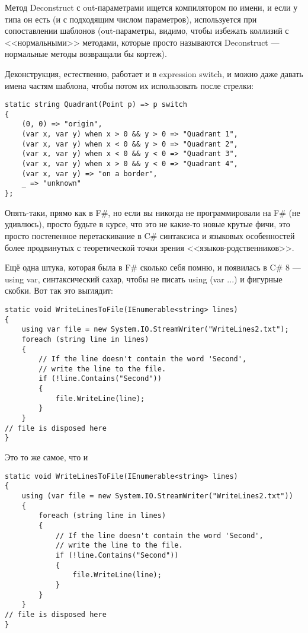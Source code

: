 \documentclass[a5paper]{article}
\begin{document}
Метод Deconstruct с out-параметрами ищется компилятором по имени, и если у типа он есть (и с подходящим числом параметров), используется при сопоставлении шаблонов (out-параметры, видимо, чтобы избежать коллизий с <<нормальными>> методами, которые просто называются Deconstruct --- нормальные методы возвращали бы кортеж).

Деконструкция, естественно, работает и в expression switch, и можно даже давать имена частям шаблона, чтобы потом их использовать после стрелки:

\begin{verbatim}
static string Quadrant(Point p) => p switch
{
    (0, 0) => "origin",
    (var x, var y) when x > 0 && y > 0 => "Quadrant 1",
    (var x, var y) when x < 0 && y > 0 => "Quadrant 2",
    (var x, var y) when x < 0 && y < 0 => "Quadrant 3",
    (var x, var y) when x > 0 && y < 0 => "Quadrant 4",
    (var x, var y) => "on a border",
    _ => "unknown"
};
\end{verbatim}

Опять-таки, прямо как в F\#, но если вы никогда не программировали на F\# (не удивлюсь), просто будьте в курсе, что это не какие-то новые крутые фичи, это просто постепенное перетаскивание в C\# синтаксиса и языковых особенностей более продвинутых с теоретической точки зрения <<языков-родственников>>.

Ещё одна штука, которая была в F\# сколько себя помню, и появилась в C\# 8 --- using var, синтаксический сахар, чтобы не писать using (var ...) и фигурные скобки. Вот так это выглядит:

\begin{verbatim}
static void WriteLinesToFile(IEnumerable<string> lines)
{
    using var file = new System.IO.StreamWriter("WriteLines2.txt");
    foreach (string line in lines)
    {
        // If the line doesn't contain the word 'Second', 
        // write the line to the file.
        if (!line.Contains("Second"))
        {
            file.WriteLine(line);
        }
    }
// file is disposed here
}
\end{verbatim}

Это то же самое, что и

\begin{verbatim}
static void WriteLinesToFile(IEnumerable<string> lines)
{
    using (var file = new System.IO.StreamWriter("WriteLines2.txt")) 
    {
        foreach (string line in lines)
        {
            // If the line doesn't contain the word 'Second', 
            // write the line to the file.
            if (!line.Contains("Second"))
            {
                file.WriteLine(line);
            }
        }
    }
// file is disposed here
}
\end{verbatim}
\end{document}
